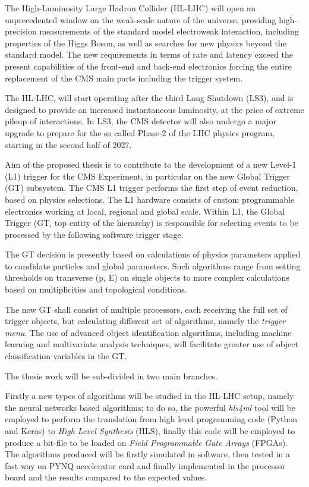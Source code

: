 \documentclass[../../main/main.tex]{subfiles}
\begin{document}
    The High-Luminosity Large Hadron Collider (HL-LHC) will open an unprecedented window on the weak-scale nature of the universe, providing high-precision measurements of the standard model electroweak interaction, including properties of the Higgs Boson, as well as searches for new physics beyond the standard model. The new requirements in terms of rate and latency exceed the present capabilities of the front-end and back-end electronics forcing the entire replacement of the CMS main parts including the trigger system.
    
    The HL-LHC, will start operating after the third Long Shutdown (LS3), and is designed to provide an increased instantaneous luminosity, at the price of extreme pileup of interactions. In LS3, the CMS detector will also undergo a major upgrade to prepare for the so called Phase-2 of the LHC physics program, starting in the second half of 2027.
    
    Aim of the proposed thesis is to contribute to the development of a new Level-1 (L1) trigger for the CMS Experiment, in particular on the new Global Trigger (GT) subsystem. The CMS L1 trigger performs the first step of event reduction, based on physics selections. The L1 hardware consists of custom programmable electronics working at local, regional and global scale. Within L1, the Global Trigger (GT, top entity of the hierarchy) is responsible for selecting events to be processed by the following software trigger stage.  
    
    The GT decision is presently based on calculations of physics parameters applied to candidate particles and global parameters. Such algorithms range from setting thresholds on transverse (p, E) on single objects to more complex calculations based on multiplicities and topological conditions.  
    
    The new GT shall consist of multiple processors, each receiving the full set of trigger objects, but calculating different set of algorithms, namely the \textit{trigger menu}. The use of advanced object identification algorithms, including machine learning and multivariate analysis techniques, will facilitate greater use of object classification variables in the GT. 
    
    The thesis work will be sub-divided in two main branches.
    
    Firstly a new types of algorithms will be studied in the HL-LHC setup, namely the neural networks based algorithms; to do so, the powerful \textit{hls4ml} tool will be employed to perform the translation from high level programming code (Python and Keras) to \textit{High Level Synthesis} (HLS), finally this code will be employed to produce a bit-file to be loaded on \textit{Field Programmable Gate Arrays} (FPGAs). The algorithms produced will be firstly simulated in software, then tested in a fast way on PYNQ accelerator card and finally implemented in the processor board and the results compared to the expected values.
    
\end{document}
